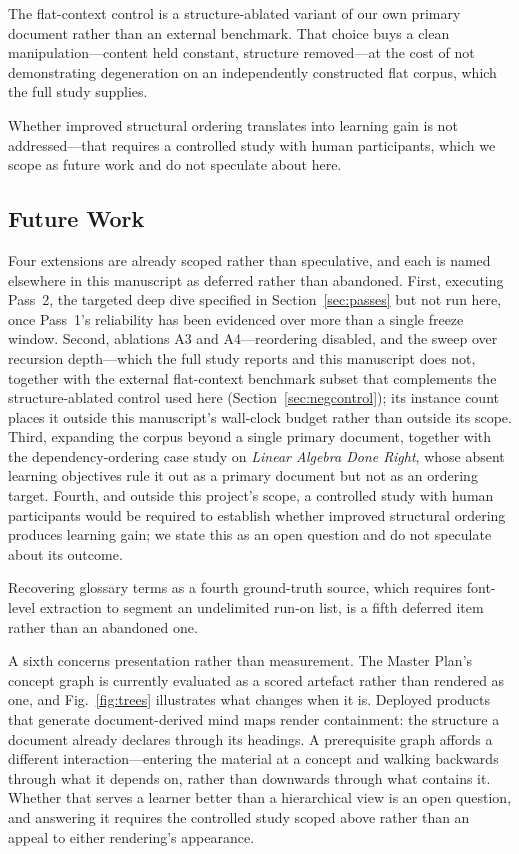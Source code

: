 \documentclass[conference]{IEEEtran}
\begin{document}
The flat-context control is a structure-ablated variant of our own primary
document rather than an external benchmark. That choice buys a clean
manipulation---content held constant, structure removed---at the cost of not
demonstrating degeneration on an independently constructed flat corpus, which
the full study supplies.

Whether improved structural ordering translates into learning gain is not
addressed---that requires a controlled study with human participants, which
we scope as future work and do not speculate about here.

\subsection{Future Work}
Four extensions are already scoped rather than speculative, and each is
named elsewhere in this manuscript as deferred rather than abandoned.
First, executing Pass~2, the targeted deep dive specified in
Section~\ref{sec:passes} but not run here, once Pass~1's reliability has
been evidenced over more than a single freeze window. Second, ablations A3
and A4---reordering disabled, and the sweep over recursion depth---which
the full study reports and this manuscript does not, together with the
external flat-context benchmark subset that complements the structure-ablated
control used here (Section~\ref{sec:negcontrol}); its instance count places it
outside this manuscript's wall-clock budget rather than outside its scope. Third, expanding the
corpus beyond a single primary document, together with the
dependency-ordering case study on \emph{Linear Algebra Done Right}, whose
absent learning objectives rule it out as a primary document but not as an
ordering target. Fourth, and outside this project's scope, a controlled
study with human participants would be required to establish whether
improved structural ordering produces learning gain; we state this as an
open question and do not speculate about its outcome.

Recovering glossary terms as a fourth ground-truth source, which requires
font-level extraction to segment an undelimited run-on list, is a fifth
deferred item rather than an abandoned one.

A sixth concerns presentation rather than measurement. The Master Plan's
concept graph is currently evaluated as a scored artefact rather than rendered
as one, and Fig.~\ref{fig:trees} illustrates what changes when it is. Deployed
products that generate document-derived mind maps render containment: the
structure a document already declares through its headings. A prerequisite
graph affords a different interaction---entering the material at a concept and
walking backwards through what it depends on, rather than downwards through
what contains it. Whether that serves a learner better than a hierarchical
view is an open question, and answering it requires the controlled study
scoped above rather than an appeal to either rendering's appearance.
\end{document}
